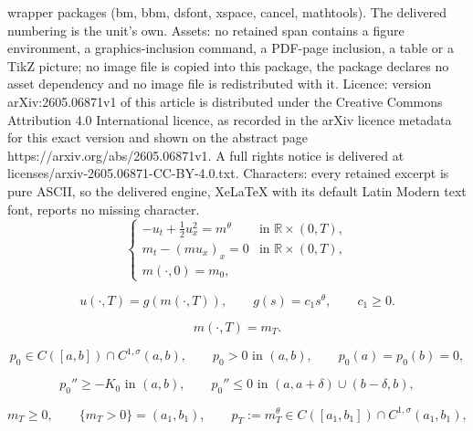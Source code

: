 \documentclass[10pt,a4paper]{amsart}
\newcommand{\R}{\mathbb R}
\begin{document}
wrapper packages (bm, bbm, dsfont, xspace, cancel, mathtools). The delivered numbering is the unit's own. Assets: no retained span contains a figure environment, a graphics-inclusion command, a PDF-page inclusion, a table or a TikZ picture; no image file is copied into this package, the package declares no asset dependency and no image file is redistributed with it. Licence: version arXiv:2605.06871v1 of this article is distributed under the Creative Commons Attribution 4.0 International licence, as recorded in the arXiv licence metadata for this exact version and shown on the abstract page https://arxiv.org/abs/2605.06871v1. A full rights notice is delivered at licenses/arxiv-2605.06871-CC-BY-4.0.txt. Characters: every retained excerpt is pure ASCII, so the delivered engine, XeLaTeX with its default Latin Modern text font, reports no missing character.
\begin{equation}
\label{eq:mfg-system}
\begin{cases}
        -u_t+\frac12 u_x^2=m^\theta
                &\text{in }\R\times(0,T),\\
        m_t-(mu_x)_x=0
                &\text{in }\R\times(0,T),\\
        m(\cdot,0)=m_0,
\end{cases}
\end{equation}

\begin{equation}
\label{ass:mfg-terminal}
        u(\cdot,T)=g(m(\cdot,T)),\qquad
        g(s)=c_1s^\theta,\qquad c_1\ge0 .
\end{equation}

\begin{equation}
\label{ass:planning-terminal}
        m(\cdot,T)=m_T .
\end{equation}

\begin{equation}
\label{ass:initial-data}
        p_0\in C([a,b])\cap C^{1,\sigma}(a,b),\qquad
        p_0>0\text{ in }(a,b),\qquad
        p_0(a)=p_0(b)=0,
\end{equation}

\begin{equation}
\label{ass:h-second}
        p_0''\ge -K_0\text{ in }(a,b),\qquad
        p_0''\le0\text{ in }(a,a+\delta)\cup(b-\delta,b),
\end{equation}

\begin{equation}
\label{ass:planning-basic}
        m_T\ge0,\qquad \{m_T>0\}=(a_1,b_1),\qquad
        p_T:=m_T^\theta\in
        C([a_1,b_1])\cap C^{1,\sigma}(a_1,b_1),
\end{equation}
\end{document}
